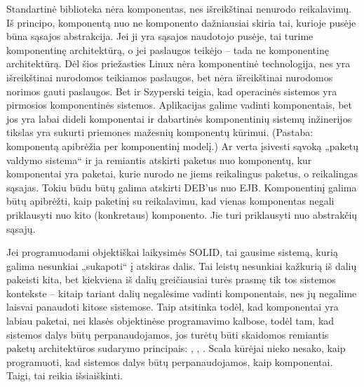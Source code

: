 Standartinė biblioteka nėra komponentas, nes išreikštinai nenurodo
reikalavimų. Iš principo, komponentą nuo ne komponento dažniausiai
skiria tai, kurioje pusėje būna sąsajos abstrakcija. Jei ji yra
sąsajos naudotojo pusėje, tai turime komponentinę architektūrą, o
jei paslaugos teikėjo – tada ne komponentinę architektūrą. Dėl šios
priežasties Linux nėra komponentinė technologija, nes yra
išreikštinai nurodomos teikiamos paslaugos, bet nėra išreikštinai
nurodomos norimos gauti paslaugos. Bet \cite[34]{heineman2001component}
ir Szyperski teigia, kad operacinės sistemos yra pirmosios
komponentinės sistemos. Aplikacijas galime vadinti komponentais, bet
jos yra labai dideli komponentai ir dabartinės komponentinių sistemų
inžinerijos tikslas yra sukurti priemones mažesnių komponentų
kūrimui. (Pastaba: \cite[34]{heineman2001component} komponentą
apibrėžia per komponentinį modelį.) Ar verta įsivesti sąvoką
„paketų valdymo sistema“ ir ja remiantis atskirti paketus nuo
komponentų, kur komponentai yra paketai, kurie nurodo ne jiems
reikalingus paketus, o reikalingas sąsajas. Tokiu būdu būtų galima
atskirti DEB'us nuo EJB. Komponentinį galima būtų apibrėžti, kaip
paketinį su reikalavimu, kad vienas komponentas negali priklausyti nuo
kito (konkretaus) komponento. Jie turi priklausyti nuo abstrakčių
sąsajų.

Jei programuodami objektiškai laikysimės SOLID, tai gausime sistemą,
kurią galima nesunkiai „sukapoti“ į atskiras dalis. Tai leistų
nesunkiai kažkurią iš dalių pakeisti kita, bet kiekviena iš dalių
greičiausiai turės prasmę tik tos sistemos kontekste – kitaip
tariant dalių negalėsime vadinti komponentais, nes jų negalime
laisvai panaudoti kitose sistemose. Taip atsitinka todėl, kad
komponentai yra labiau paketai, nei klasės objektinėse programavimo
kalbose, todėl tam, kad sistemos dalys būtų perpanaudojamos, jos
turėtų būti skaidomos remiantis paketų architektūros sudarymo
principais: ,
, 
\cite[17]{design-principles-and-design-patterns}.
Scala kūrėjai nieko nesako, kaip programuoti, kad sistemos
dalys būtų perpanaudojamos, kaip komponentai. Taigi, tai reikia
išsiaiškinti.


